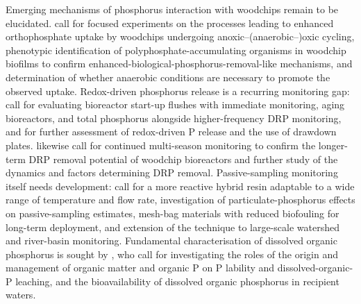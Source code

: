 Emerging mechanisms of phosphorus interaction with woodchips remain to be elucidated. \textcite{Zhang2024b} call for focused experiments on the processes leading to enhanced orthophosphate uptake by woodchips undergoing anoxic--(anaerobic--)oxic cycling, phenotypic identification of polyphosphate-accumulating organisms in woodchip biofilms to confirm enhanced-biological-phosphorus-removal-like mechanisms, and determination of whether anaerobic conditions are necessary to promote the observed uptake. Redox-driven phosphorus release is a recurring monitoring gap: \textcite{Bailon2025} call for evaluating bioreactor start-up flushes with immediate monitoring, aging bioreactors, and total phosphorus alongside higher-frequency DRP monitoring, and for further assessment of redox-driven P release and the use of drawdown plates. \textcite{Rivas2020} likewise call for continued multi-season monitoring to confirm the longer-term DRP removal potential of woodchip bioreactors and further study of the dynamics and factors determining DRP removal. Passive-sampling monitoring itself needs development: \textcite{Li2020b} call for a more reactive hybrid resin adaptable to a wide range of temperature and flow rate, investigation of particulate-phosphorus effects on passive-sampling estimates, mesh-bag materials with reduced biofouling for long-term deployment, and extension of the technique to large-scale watershed and river-basin monitoring. Fundamental characterisation of dissolved organic phosphorus is sought by \textcite{Liu2024b}, who call for investigating the roles of the origin and management of organic matter and organic P on P lability and dissolved-organic-P leaching, and the bioavailability of dissolved organic phosphorus in recipient waters.

